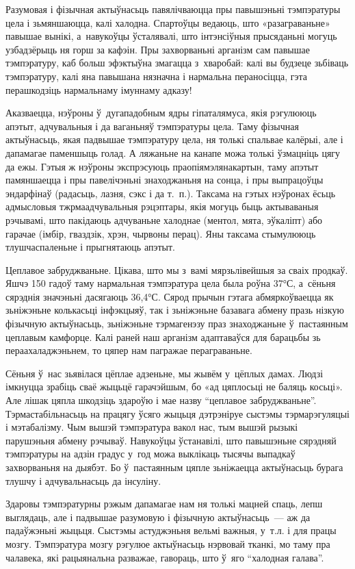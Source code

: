 Разумовая і фізычная актыўнасьць павялічваюцца пры павышэньні тэмпэратуры цела і зьмяншаюцца, калі халодна. Спартоўцы ведаюць, што «разаграваньне» павышае вынікі, а~навукоўцы ўсталявалі, што інтэнсіўныя прысяданьні могуць узбадзёрыць ня горш за кафэін. Пры захворваньні арганізм сам павышае тэмпэратуру, каб больш эфэктыўна змагацца з~хваробай: калі вы будзеце зьбіваць тэмпэратуру, калі яна павышана нязначна і нармальна пераносіцца, гэта перашкодзіць нармальнаму імуннаму адказу!

Аказваецца, нэўроны ў~дугападобным ядры гіпаталямуса, якія рэгулююць апэтыт, адчувальныя і да ваганьняў тэмпэратуры цела. Таму фізычная актыўнасьць, якая падвышае тэмпэратуру цела, ня толькі спальвае калёрыі, але і дапамагае паменшыць голад. А ляжаньне на канапе можа толькі ўзмацніць цягу да ежы. Гэтыя ж нэўроны экспрэсуюць праопіямэлянакартын, таму апэтыт памяншаецца і пры павелічэньні знаходжаньня на сонца, і пры выпрацоўцы эндарфінаў (радасьць, лазня, сэкс і да т.~п.). Таксама на гэтых нэўронах ёсьць адмысловыя тжрмаадчувальныя рэцэптары, якія могуць быць актываваныя рэчывамі, што пакідаюць адчуваньне халоднае (ментол, мята, эўкаліпт) або гарачае (імбір, гваздзік, хрэн, чырвоны перац). Яны таксама стымулююць тлушчаспаленьне і прыгнятаюць апэтыт.

Цеплавое забруджваньне. Цікава, што мы з~вамі мярзьлівейшыя за сваіх продкаў. Яшчэ 150 гадоў таму нармальная тэмпэратура цела была роўна 37°С, а~сёньня сярэднія значэньні дасягаюць 36,4°С. Сярод прычын гэтага абмяркоўваецца як зьніжэньне колькасьці інфэкцыяў, так і зьніжэньне базавага абмену празь нізкую фізычную актыўнасьць, зьніжэньне тэрмагенэзу праз знаходжаньне ў~пастаянным цеплавым камфорце. Калі раней наш арганізм адаптаваўся для барацьбы зь пераахаладжэньнем, то цяпер нам пагражае пераграваньне.

Сёньня ў~нас зьявілася цёплае адзеньне, мы жывём у~цёплых дамах. Людзі імкнуцца зрабіць сваё жыцьцё гарачэйшым, бо «ад цяплосьці не баляць косьці». Але лішак цяпла шкодзіць здароўю і мае назву ``цеплавое забруджваньне''. Тэрмастабільнасьць на працягу ўсяго жыцьця дэтрэніруе сыстэмы тэрмарэгуляцыі і мэтабалізму. Чым вышэй тэмпэратура вакол нас, тым вышэй рызыкі парушэньня абмену рэчываў. Навукоўцы ўстанавілі, што павышэньне сярэдняй тэмпэратуры на адзін градус у~год можа выклікаць тысячы выпадкаў захворваньня на дыябэт. Бо ў~пастаянным цяпле зьніжаецца актыўнасьць бурага тлушчу і адчувальнасьць да інсуліну.

Здаровы тэмпэратурны рэжым дапамагае нам ня толькі мацней спаць, лепш выглядаць, але і падвышае разумовую і фізычную актыўнасьць~--- аж да падаўжэньні жыцьця. Сыстэмы астуджэньня вельмі важныя, у~т.л. і для працы мозгу. Тэмпэратура мозгу рэгулюе актыўнасьць нэрвовай тканкі, мо таму пра чалавека, які рацыянальна разважае, гавораць, што ў~яго ``халодная галава''.

